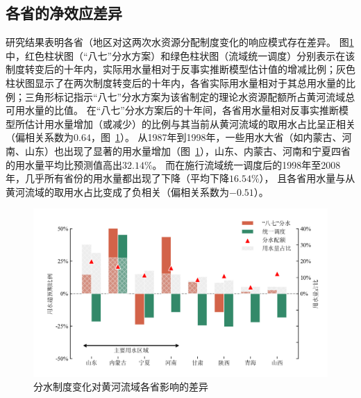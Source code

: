 




\subsection{各省的净效应差异}\label{result-3}

研究结果表明各省（地区对这两次水资源分配制度变化的响应模式存在差异。
图\ref{fig:regulating}中，红色柱状图（“八七”分水方案）和绿色柱状图（流域统一调度）分别表示在该制度转变后的十年内，实际用水量相对于反事实推断模型估计值的增减比例；灰色柱状图显示了在两次制度转变后的十年内，各省实际用水量相对于其总用水量的比例；三角形标记指示“八七”分水方案为该省制定的理论水资源配额所占黄河流域总可用水量的比值。
在“八七”分水方案后的十年间，各省用水量相对反事实推断模型所估计用水量增加（或减少）的比例与其当前从黄河流域的取用水占比呈正相关（偏相关系数为$0.64$，图~\ref{fig:regulating}）。
从1987年到1998年，一些用水大省（如内蒙古、河南、山东）也出现了显著的用水量增加（图~\ref{fig:regulating}），山东、内蒙古、河南和宁夏四省的用水量平均比预测值高出$32.14\%$。
而在施行流域统一调度后的1998年至2008年，几乎所有省份的用水量都出现了下降（平均下降$16.54\%$），
且各省用水量与从黄河流域的取用水占比变成了负相关（偏相关系数为$-0.51$）。

\begin{figure}[!ht]
	\includegraphics[width=\textwidth]{img/ch5/fig3.png}
	\caption[分水制度变化对黄河流域各省影响的差异]{分水制度变化对黄河流域各省影响的差异}\label{fig:regulating}
\end{figure}
